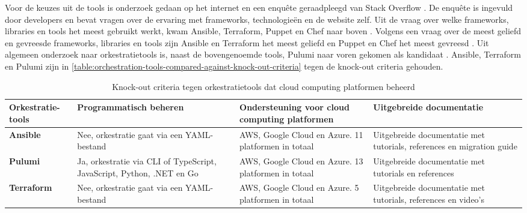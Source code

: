 \newpage

Voor de keuzes uit de tools is onderzoek gedaan op het internet en een enquête geraadpleegd van Stack Overflow \cite{stack-overflow-survey-2020}. De enquête is ingevuld door developers en bevat vragen over de ervaring met frameworks, technologieën en de website zelf. Uit de vraag over welke frameworks, libraries en tools het meest gebruikt werkt, kwam Ansible, Terraform, Puppet en Chef naar boven \cite{stack-overflow-survey-2020-popular-framework-libraries-tools}. Volgens een vraag over de meest geliefd en gevreesde frameworks, libraries en tools zijn Ansible en Terraform het meest geliefd en Puppet en Chef het meest gevreesd \cite{stack-overflow-survey-2020-loved-dreaded-framework-libraries-tools}. Uit algemeen onderzoek naar orkestratietools is, naast de bovengenoemde tools, Pulumi naar voren gekomen als kandidaat \cite{pulumi}. Ansible, Terraform en Pulumi zijn in \autoref{table:orchestration-tools-compared-against-knock-out-criteria} tegen de knock-out criteria gehouden.

\begin{table}[hbt!]
  \centering
  \caption{Knock-out criteria tegen orkestratietools dat cloud computing platformen beheerd}
  \vspace*{.5\baselineskip}
  \begin{tabular}{|p{.15\linewidth}|p{.245\linewidth}|p{.245\linewidth}|p{.245\linewidth}|}
  \hline
  \textbf{Orkestratie-\newline tools} & \textbf{Programmatisch \newline beheren} & \textbf{Ondersteuning voor cloud computing \newline platformen} & \textbf{Uitgebreide \newline documentatie} \\ \hline
    \textbf{Ansible} &
    Nee, orkestratie gaat via een YAML-bestand \cite{ansible-code} &
    AWS, Google Cloud en Azure. 11 platformen in totaal \cite{ansible-cloud-platforms} &
    Uitgebreide documentatie met tutorials, references en migration guide \cite{ansible-docs}
    \\ \hline

    \textbf{Pulumi} &
    Ja, orkestratie via CLI of TypeScript, JavaScript, Python, .NET en Go \cite{pulumi-code} &
    AWS, Google Cloud en Azure. 13 platformen in totaal \cite{pulumi-cloud-platforms} &
    Uitgebreide documentatie met tutorials en references \cite{pulumi-docs}
    \\ \hline

    \textbf{Terraform} &
    Nee, orkestratie gaat via een YAML-bestand \cite{terraform-code} &
    AWS, Google Cloud en Azure. 5 platformen in totaal \cite{terraform-cloud-platforms} &
    Uitgebreide documentatie met tutorials, references en video's \cite{terraform-docs}
    \\ \hline
  \end{tabular}
  \label{table:orchestration-tools-compared-against-knock-out-criteria}
\end{table}

